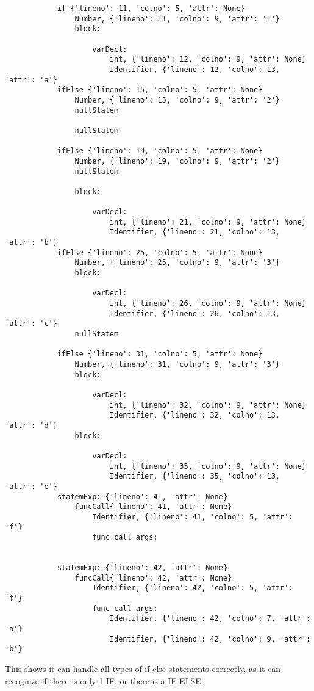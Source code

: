 \documentclass{article}
\begin{document}
\begin{itemize}
\begin{verbatim}
            if {'lineno': 11, 'colno': 5, 'attr': None}
                Number, {'lineno': 11, 'colno': 9, 'attr': '1'}
                block:

                    varDecl:
                        int, {'lineno': 12, 'colno': 9, 'attr': None}
                        Identifier, {'lineno': 12, 'colno': 13, 'attr': 'a'}
            ifElse {'lineno': 15, 'colno': 5, 'attr': None}
                Number, {'lineno': 15, 'colno': 9, 'attr': '2'}
                nullStatem

                nullStatem

            ifElse {'lineno': 19, 'colno': 5, 'attr': None}
                Number, {'lineno': 19, 'colno': 9, 'attr': '2'}
                nullStatem

                block:

                    varDecl:
                        int, {'lineno': 21, 'colno': 9, 'attr': None}
                        Identifier, {'lineno': 21, 'colno': 13, 'attr': 'b'}
            ifElse {'lineno': 25, 'colno': 5, 'attr': None}
                Number, {'lineno': 25, 'colno': 9, 'attr': '3'}
                block:

                    varDecl:
                        int, {'lineno': 26, 'colno': 9, 'attr': None}
                        Identifier, {'lineno': 26, 'colno': 13, 'attr': 'c'}
                nullStatem

            ifElse {'lineno': 31, 'colno': 5, 'attr': None}
                Number, {'lineno': 31, 'colno': 9, 'attr': '3'}
                block:

                    varDecl:
                        int, {'lineno': 32, 'colno': 9, 'attr': None}
                        Identifier, {'lineno': 32, 'colno': 13, 'attr': 'd'}
                block:

                    varDecl:
                        int, {'lineno': 35, 'colno': 9, 'attr': None}
                        Identifier, {'lineno': 35, 'colno': 13, 'attr': 'e'}
            statemExp: {'lineno': 41, 'attr': None}
                funcCall{'lineno': 41, 'attr': None}
                    Identifier, {'lineno': 41, 'colno': 5, 'attr': 'f'}
                    func call args:


            statemExp: {'lineno': 42, 'attr': None}
                funcCall{'lineno': 42, 'attr': None}
                    Identifier, {'lineno': 42, 'colno': 5, 'attr': 'f'}
                    func call args:
                        Identifier, {'lineno': 42, 'colno': 7, 'attr': 'a'}
                        Identifier, {'lineno': 42, 'colno': 9, 'attr': 'b'}
        \end{verbatim}
        This shows it can handle all types of if-else statements correctly, as it can recognize if there is only 1 IF, or there is a IF-ELSE.


\end{itemize}
\end{document}
